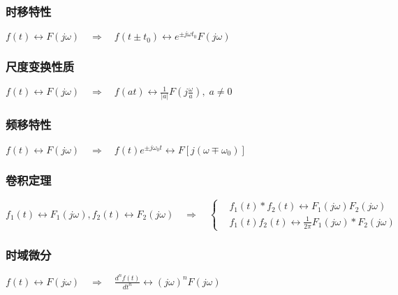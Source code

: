 \documentclass[UTF8]{article}
\theoremstyle{definition}
\begin{document}
\subsubsection{时移特性}
\begin{center}
$f(t) \leftrightarrow F(j \omega)  \quad \Rightarrow \quad f\left(t \pm t_0\right) \leftrightarrow e^{ \pm j \omega t_0} F(j \omega)$
\end{center}

\subsubsection{尺度变换性质}
\begin{center}
$f(t) \leftrightarrow F(j \omega)  \quad \Rightarrow \quad f(a t) \leftrightarrow \frac{1}{|a|} F\left(j \frac{\omega}{a}\right), \;a \ne 0$
\end{center}


\subsubsection{频移特性}
\begin{center}
$f(t) \leftrightarrow F(j \omega)  \quad \Rightarrow \quad f(t) e^{ \pm j \omega_0 t} \leftrightarrow F\left[j\left(\omega \mp \omega_0\right)\right]$
\end{center}



\subsubsection{卷积定理}
\begin{center}
$  f_1(t) \leftrightarrow F_1(j \omega), f_2(t) \leftrightarrow F_2(j \omega) \quad \Rightarrow \quad  \begin{cases} & f_1(t) * f_2(t) \leftrightarrow F_1(j \omega) F_2(j \omega) \\ & f_1(t) f_2(t) \leftrightarrow \frac{1}{2 \pi} F_1(j \omega) * F_2(j \omega)\end{cases}$
\end{center}



\subsubsection{时域微分}
\begin{center}
$f(t) \leftrightarrow F(j \omega)  \quad \Rightarrow \quad \frac{d^n f(t)}{d t^n} \leftrightarrow(j \omega)^n F(j \omega)$
\end{center}
\end{document}

